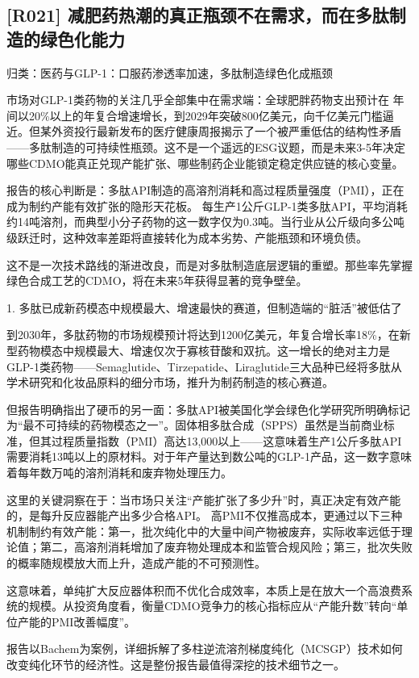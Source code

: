 \documentclass[11pt]{ctexart}
\begin{document}
\subsection{[R021] 减肥药热潮的真正瓶颈不在需求，而在多肽制造的绿色化能力}
{\small\color{refgray}归类：医药与GLP-1：口服药渗透率加速，多肽制造绿色化成瓶颈}

市场对GLP-1类药物的关注几乎全部集中在需求端：全球肥胖药物支出预计在 年间以20\%以上的年复合增速增长，到2029年突破800亿美元，向千亿美元门槛逼近。但某外资投行最新发布的医疗健康周报揭示了一个被严重低估的结构性矛盾——多肽制造的可持续性瓶颈。这不是一个遥远的ESG议题，而是未来3-5年决定哪些CDMO能真正兑现产能扩张、哪些制药企业能锁定稳定供应链的核心变量。

报告的核心判断是：多肽API制造的高溶剂消耗和高过程质量强度（PMI），正在成为制约产能有效扩张的隐形天花板。 每生产1公斤GLP-1类多肽API，平均消耗约14吨溶剂，而典型小分子药物的这一数字仅为0.3吨。当行业从公斤级向多公吨级跃迁时，这种效率差距将直接转化为成本劣势、产能瓶颈和环境负债。

这不是一次技术路线的渐进改良，而是对多肽制造底层逻辑的重塑。那些率先掌握绿色合成工艺的CDMO，将在未来5年获得显著的竞争壁垒。

1. 多肽已成新药模态中规模最大、增速最快的赛道，但制造端的“脏活”被低估了

到2030年，多肽药物的市场规模预计将达到1200亿美元，年复合增长率18\%，在新型药物模态中规模最大、增速仅次于寡核苷酸和双抗。这一增长的绝对主力是GLP-1类药物——Semaglutide、Tirzepatide、Liraglutide三大品种已经将多肽从学术研究和化妆品原料的细分市场，推升为制药制造的核心赛道。

但报告明确指出了硬币的另一面：多肽API被美国化学会绿色化学研究所明确标记为“最不可持续的药物模态之一”。固体相多肽合成（SPPS）虽然是当前商业标准，但其过程质量指数（PMI）高达13,000以上——这意味着生产1公斤多肽API需要消耗13吨以上的原材料。对于年产量达到数公吨的GLP-1产品，这一数字意味着每年数万吨的溶剂消耗和废弃物处理压力。

这里的关键洞察在于：当市场只关注“产能扩张了多少升”时，真正决定有效产能的，是每升反应器能产出多少合格API。 高PMI不仅推高成本，更通过以下三种机制制约有效产能：第一，批次纯化中的大量中间产物被废弃，实际收率远低于理论值；第二，高溶剂消耗增加了废弃物处理成本和监管合规风险；第三，批次失败的概率随规模放大而上升，造成产能的不可预测性。

这意味着，单纯扩大反应器体积而不优化合成效率，本质上是在放大一个高浪费系统的规模。从投资角度看，衡量CDMO竞争力的核心指标应从“产能升数”转向“单位产能的PMI改善幅度”。

报告以Bachem为案例，详细拆解了多柱逆流溶剂梯度纯化（MCSGP）技术如何改变纯化环节的经济性。这是整份报告最值得深挖的技术细节之一。
\end{document}
